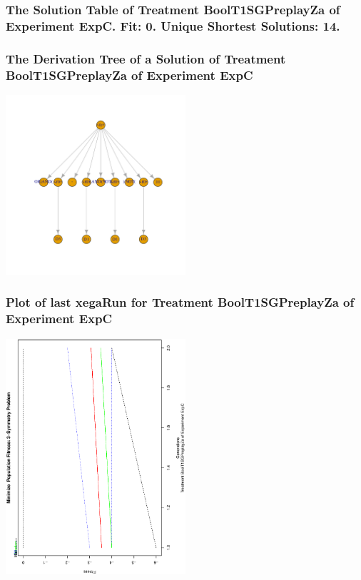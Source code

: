 \documentclass[18pt,c]{beamer}
\begin{document}
 \begin{frame}
 \fontsize{8pt}{9pt}\selectfont
 \frametitle{ The Solution Table of Treatment BoolT1SGPreplayZa of Experiment ExpC. Fit: 0. Unique Shortest Solutions: 14. }

 \label{ExpCSolutionTable002.tex}  
 \end{frame}

 \begin{frame}
 \frametitle{ The Derivation Tree of a Solution of Treatment BoolT1SGPreplayZa of Experiment ExpC }
 \begin{center}
\includegraphics[width=0.5\textwidth, angle=0]
{ExpCDerivationTreeFigure002.pdf}
 \end{center}
 \label{report/ExpCDerivationTreeFigure002.pdf}  
 \end{frame}

 \begin{frame}
 \frametitle{ Plot of last xegaRun for Treatment BoolT1SGPreplayZa of Experiment ExpC }
 \begin{center}
\includegraphics[width=0.5\textwidth, angle=-90]
{ExpCPlotPopStatsFigure002.eps}
 \end{center}
 \label{report/ExpCPlotPopStatsFigure002.eps}  
 \end{frame}
\end{document}
